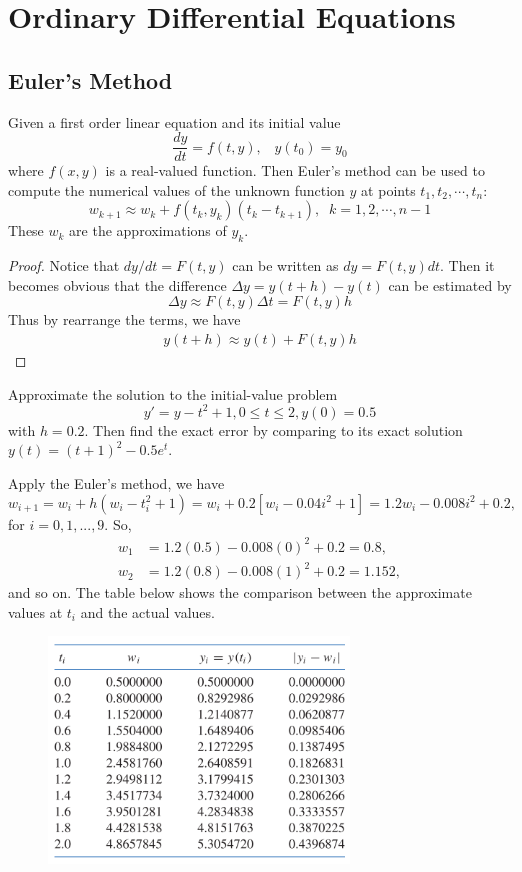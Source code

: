 \chapter{Ordinary Differential Equations}
\section{Euler's Method}
\begin{thm}
	Given a first order linear equation and its initial value
	\[ \frac{dy}{dt} = f(t,y),\;\;\;y(t_0) = y_0 \]
	where $f(x,y)$ is a real-valued function. Then Euler's method can be used to compute the numerical values of the unknown function $y$ at points $t_1, t_2, \cdots, t_n$:
		\[w_{k+1} \approx w_{k} + f(t_k, y_k)(t_{k} - t_{k+1}),\;\;k=1,2,\cdots, n-1\]
	These $w_k$ are the approximations of $y_k$.
\end{thm}

\begin{proof}
	Notice that $dy/dt = F(t,y)$ can be written as $dy = F(t,y)dt$. Then it becomes obvious that the difference $\Delta y = y(t+h) - y(t)$ can be estimated by 
	\[ \Delta y \approx F(t,y)\Delta t = F(t,y)h \]
	Thus by rearrange the terms, we have
	\begin{align*}
	y(t+h) \approx y(t) + F(t,y)h
	\end{align*}
\end{proof}

\begin{ex}
	Approximate the solution to the initial-value problem
	\[ y' = y - t^2 + 1, 0 \leq t \leq 2, y(0) = 0.5 \]
	with $h=0.2$. Then find the exact error by comparing to its exact solution $y(t) = (t + 1)^2 - 0.5e^t$. 
	\begin{solution}
		Apply the Euler's method, we have
		\[ w_{i+1} = w_i + h(w_i - t^2_i + 1) = w_i + 0.2[w_i - 0.04i^2 + 1] = 1.2w_i - 0.008i^2 + 0.2,\]
		for $i = 0, 1,... , 9$. So,
		\begin{align*}
		w_1 &= 1.2(0.5) - 0.008(0)^2 + 0.2 = 0.8, \\
		w_2 &= 1.2(0.8) - 0.008(1)^2 + 0.2 = 1.152,
		\end{align*} 
		and so on. The table below shows the comparison between the approximate values at $t_i$ and the actual values.
		\begin{figure}[H]
			\centering
			\includegraphics*[width=8cm]{img/chapter8table0.PNG}
		\end{figure}
	\end{solution}
\end{ex}


